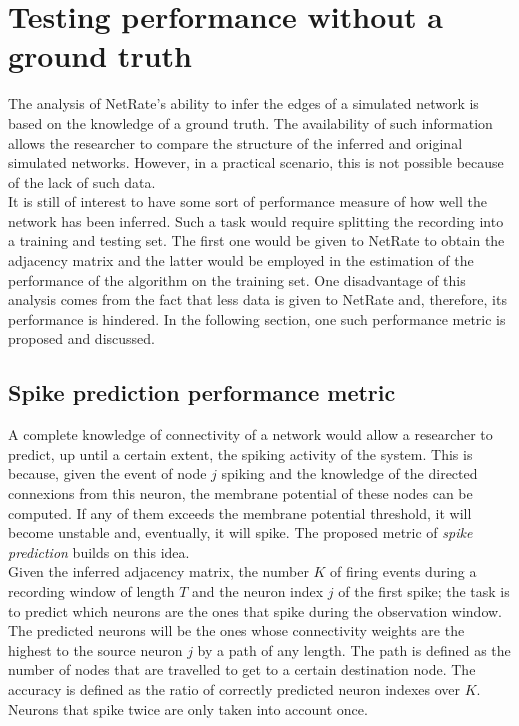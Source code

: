 
\chapter{Testing performance without a ground truth}


The analysis of NetRate's ability to infer the edges of a simulated network is based on the knowledge of a ground truth. The availability of such information allows the researcher to compare the structure of the inferred and original simulated networks. However, in a practical scenario, this is not possible because of the lack of such data. \\ 

It is still of interest to have some sort of performance measure of how well the network has been inferred. Such a task would require splitting the recording into a training and testing set. The first one would be given to NetRate to obtain the adjacency matrix and the latter would be employed in the estimation of the performance of the algorithm on the training set. One disadvantage of this analysis comes from the fact that less data is given to NetRate and, therefore, its performance is hindered. In the following section, one such performance metric is proposed and discussed.\\

\section{Spike prediction performance metric}

A complete knowledge of connectivity of a network would allow a researcher to predict, up until a certain extent, the spiking activity of the system. This is because, given the event of node \(j\) spiking and the knowledge of the directed connexions from this neuron, the membrane potential of these nodes can be computed. If any of them exceeds the membrane potential threshold, it will become unstable and, eventually, it will spike. The proposed metric of \textit{spike prediction} builds on this idea. \\

Given the inferred adjacency matrix, the number \(K\) of firing events during a recording window of length \(T\) and the neuron index \(j\) of the first spike; the task is to predict which neurons are the ones that spike during the observation window. The predicted neurons will be the ones whose connectivity weights are the highest to the source neuron \(j\) by a path of any length. The path is defined as the number of nodes that are travelled to get to a certain destination node. The accuracy is defined as the ratio of correctly predicted neuron indexes over \(K\). Neurons that spike twice are only taken into account once.\\

